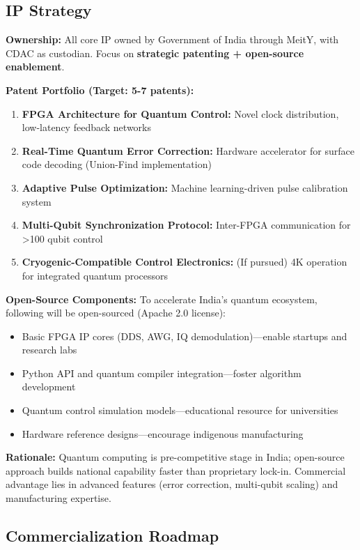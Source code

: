 \documentclass[12pt,a4paper]{article}
\begin{document}
\begin{enumerate}[leftmargin=*]
\subsection{IP Strategy}

\textbf{Ownership:} All core IP owned by Government of India through MeitY, with CDAC as custodian. Focus on \textbf{strategic patenting + open-source enablement}.

\textbf{Patent Portfolio (Target: 5-7 patents):}
\begin{enumerate}[leftmargin=*]
    \item \textbf{FPGA Architecture for Quantum Control:} Novel clock distribution, low-latency feedback networks
    \item \textbf{Real-Time Quantum Error Correction:} Hardware accelerator for surface code decoding (Union-Find implementation)
    \item \textbf{Adaptive Pulse Optimization:} Machine learning-driven pulse calibration system
    \item \textbf{Multi-Qubit Synchronization Protocol:} Inter-FPGA communication for >100 qubit control
    \item \textbf{Cryogenic-Compatible Control Electronics:} (If pursued) 4K operation for integrated quantum processors
\end{enumerate}

\textbf{Open-Source Components:}
To accelerate India's quantum ecosystem, following will be open-sourced (Apache 2.0 license):
\begin{itemize}[leftmargin=*]
    \item Basic FPGA IP cores (DDS, AWG, IQ demodulation)—enable startups and research labs
    \item Python API and quantum compiler integration—foster algorithm development
    \item Quantum control simulation models—educational resource for universities
    \item Hardware reference designs—encourage indigenous manufacturing
\end{itemize}

\textbf{Rationale:} Quantum computing is pre-competitive stage in India; open-source approach builds national capability faster than proprietary lock-in. Commercial advantage lies in advanced features (error correction, multi-qubit scaling) and manufacturing expertise.

\subsection{Commercialization Roadmap}


\end{enumerate}
\end{document}
